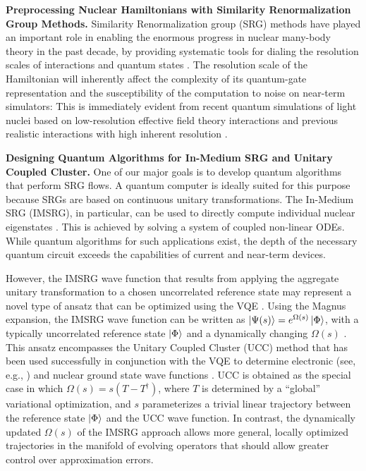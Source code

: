 \documentclass[10pt]{article}
\begin{document}
\textbf{Preprocessing Nuclear Hamiltonians with Similarity Renormalization Group Methods.} Similarity Renormalization group (SRG) methods have played an important role in enabling the enormous progress in nuclear many-body theory in the past decade, by providing systematic tools for dialing the resolution scales of interactions and quantum states \cite{Bogner:2010pq,Hergert:2016jk,Hergert:2017kx,Stroberg:2019mx}. The resolution scale of the Hamiltonian will inherently affect the complexity of its quantum-gate representation and the susceptibility of the computation to noise on near-term simulators: This is immediately evident from recent quantum simulations of light nuclei based on low-resolution effective field theory interactions \cite{Dumitrescu:2018az,Lu:2018aq} and previous realistic interactions with high inherent resolution \cite{Roggero:2019sr}.

\textbf{Designing Quantum Algorithms for In-Medium SRG and Unitary Coupled Cluster.} One of our major goals is to develop quantum algorithms that perform SRG flows. A quantum computer is ideally suited for this purpose because SRGs are based on continuous unitary transformations. The In-Medium SRG (IMSRG), in particular, can be used to directly compute individual nuclear eigenstates \cite{Hergert:2016jk,Hergert:2016ij,Hergert:2017kx}. This is achieved by solving a system of coupled non-linear ODEs. While quantum algorithms for such applications exist, the depth of the necessary quantum circuit exceeds the capabilities of current and near-term devices.

However, the IMSRG wave function that results from applying the aggregate unitary transformation to a chosen uncorrelated reference state may represent a novel type of ansatz that can be optimized using the VQE \cite{Dawson:2008td}. Using the Magnus expansion, the IMSRG wave function can be written as $\ket{\Psi(s)}=e^{\Omega(s)}\ket{\Phi}$, with a typically uncorrelated reference state $\ket{\Phi}$ and a dynamically changing $\Omega(s)$ \cite{Morris:2015ve}. This ansatz encompasses the Unitary Coupled Cluster (UCC) method that has been used successfully in conjunction with the VQE to determine electronic (see, e.g., \cite{Wecker:2015bk,McClean:2016qr,Lee:2019dd}) and nuclear ground state wave functions \cite{Dumitrescu:2018az,Lu:2018aq}. UCC is obtained as the special case in which $\Omega(s)=s(T-T^{\dag})$, where $T$ is determined by a ``global'' variational optimization, and $s$ parameterizes a trivial linear trajectory between the reference state $\ket{\Phi}$ and the UCC wave function. In contrast, the dynamically updated $\Omega(s)$ of the IMSRG approach allows more general, locally optimized trajectories in the manifold of evolving operators that should allow greater control over approximation errors.
\end{document}
